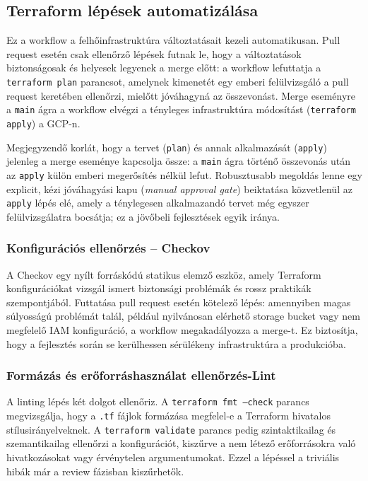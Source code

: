         \subsection{Terraform lépések automatizálása}
        Ez a workflow a felhőinfrastruktúra változtatásait kezeli automatikusan.
        Pull request esetén csak ellenőrző lépések futnak le, hogy a változtatások biztonságosak és helyesek legyenek a merge előtt:
        a workflow lefuttatja a \texttt{terraform plan} parancsot, amelynek kimenetét egy emberi felülvizsgáló a pull request keretében
        ellenőrzi, mielőtt jóváhagyná az összevonást. Merge eseményre a \texttt{main} ágra a workflow elvégzi a tényleges infrastruktúra
        módosítást (\texttt{terraform apply}) a GCP-n.

        Megjegyzendő korlát, hogy a tervet (\texttt{plan}) és annak alkalmazását (\texttt{apply}) jelenleg a merge eseménye kapcsolja össze:
        a \texttt{main} ágra történő összevonás után az \texttt{apply} külön emberi megerősítés nélkül lefut. Robusztusabb megoldás lenne
        egy explicit, kézi jóváhagyási kapu (\textit{manual approval gate}) beiktatása közvetlenül az \texttt{apply} lépés elé, amely a
        ténylegesen alkalmazandó tervet még egyszer felülvizsgálatra bocsátja; ez a jövőbeli fejlesztések egyik iránya.

            \subsubsection{Konfigurációs ellenőrzés – Checkov}
            A Checkov egy nyílt forráskódú statikus elemző eszköz, amely Terraform konfigurációkat vizsgál ismert biztonsági problémák és rossz praktikák szempontjából\cite{checkov}.
            Futtatása pull request esetén kötelező lépés: amennyiben magas súlyosságú problémát talál, például nyilvánosan elérhető storage bucket vagy nem megfelelő IAM konfiguráció,
            a workflow megakadályozza a merge-t. Ez biztosítja, hogy a fejlesztés során se kerülhessen sérülékeny infrastruktúra a produkcióba.

            \subsubsection{Formázás és erőforráshasználat ellenőrzés-Lint}
            A linting lépés két dolgot ellenőriz. A \texttt{terraform fmt --check} parancs megvizsgálja, hogy a \texttt{.tf} fájlok formázása megfelel-e a Terraform hivatalos stílusirányelveknek.
            A \texttt{terraform validate} parancs pedig szintaktikailag és szemantikailag ellenőrzi a konfigurációt, kiszűrve a nem létező erőforrásokra való hivatkozásokat
            vagy érvénytelen argumentumokat. Ezzel a lépéssel a triviális hibák már a review fázisban kiszűrhetők.

